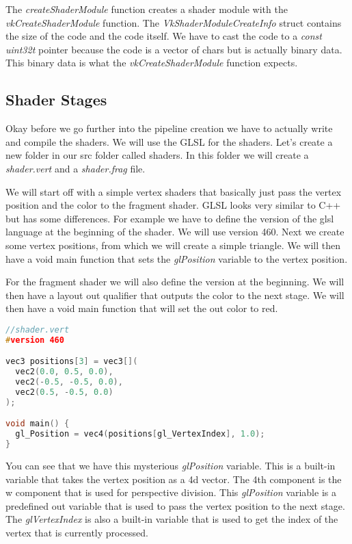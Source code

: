 \documentclass[12pt]{report} \usepackage{preamble}
\begin{document}
The \textit{createShaderModule} function creates a shader module with the \textit{vkCreateShaderModule} function. The
\textit{VkShaderModuleCreateInfo} struct contains the size of the code and the code itself. We have to cast the code to
a \textit{const uint32\textunderscore t} pointer because the code is a vector of chars but is actually binary data.
This binary data is what the \textit{vkCreateShaderModule} function expects.

\subsection{Shader Stages}

Okay before we go further into the pipeline creation we have to actually write and compile the shaders. We will use the
\ac{GLSL} for the shaders. Let's create a new folder in our src folder called shaders. In this folder we will create
a \textit{shader.vert} and a \textit{shader.frag} file.

We will start off with a simple vertex shaders that basically just pass the vertex position and the color to the fragment shader.
\ac{GLSL} looks very similar to C++ but has some differences. For example we have to define the version of the glsl language
at the beginning of the shader. We will use version 460. Next we create some vertex positions, from which we will create a simple triangle.
We will then have a void main function that sets the \textit{gl\textunderscore Position} variable to the vertex position.

For the fragment shader we will also define the version at the beginning. We will then have a layout out qualifier that outputs the
color to the next stage. We will then have a void main function that will set the out color to red.

\begin{lstlisting}[language=C++]
//shader.vert
#version 460

vec3 positions[3] = vec3[](
  vec2(0.0, 0.5, 0.0),
  vec2(-0.5, -0.5, 0.0),
  vec2(0.5, -0.5, 0.0)
);

void main() {
  gl_Position = vec4(positions[gl_VertexIndex], 1.0);
}
\end{lstlisting}

You can see that we have this mysterious \textit{gl\textunderscore Position} variable. This is a built-in variable that
takes the vertex position as a 4d vector. The 4th component is the w component that is used for perspective division.
This \textit{gl\textunderscore Position} variable is a predefined out variable that is used to pass the vertex position
to the next stage. The \textit{gl\textunderscore VertexIndex} is also a built-in variable that is used to get the index
of the vertex that is currently processed.
\end{document}

